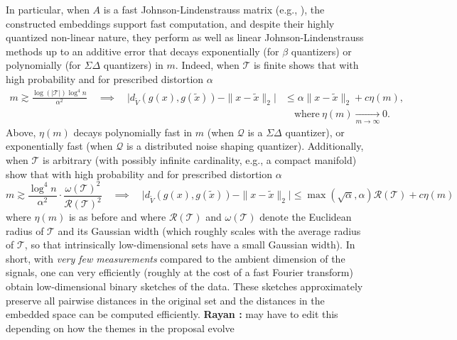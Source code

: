 \documentclass{article}
\newcommand{\comment}[3]{{\color{#1} {\bf #2 :} #3}}
\newcommand{\yoav}[1]{\comment{magenta}{Yoav}{#1}}
\newcommand{\rayan}[1]{\comment{red}{Rayan}{#1}}
\newcommand{\rad}{\mathcal{R}}
\begin{document}
In particular, when $A$ is a fast Johnson-Lindenstrauss matrix (e.g., \cite{}), the constructed embeddings support fast computation, and despite their highly quantized non-linear nature, they perform as well as linear Johnson-Lindenstrauss methods up to an additive error that decays exponentially (for $\beta$ quantizers) or polynomially (for $\Sigma\Delta$ quantizers)  in $m$. 
{Indeed, when $\mathcal{T}$ is finite} \cite{huynh2018fast} shows that with high probability %
and for prescribed distortion $\alpha$
\begin{align*} m \gtrsim \frac{\log{(|\mathcal{T}|)} \log^4 n}{\alpha^2} \quad \implies  \quad \big|d_{\widetilde{V}}(g(x), g(\tilde{x})) - \|x - \tilde{x}\|_2\big| & \leq {\alpha}\|x - \tilde{x}\|_2 + c\eta(m), \\ &\quad\text{where} \ \eta(m) \xrightarrow[m \rightarrow \infty]{} 0. \end{align*}
Above, $\eta(m)$ decays polynomially fast in $m$ (when $\mathcal{Q}$ is a $\Sigma\Delta$ quantizer), or exponentially fast (when $\mathcal{Q}$ is a distributed noise shaping quantizer). %
{Additionally, when $\mathcal{T}$ is arbitrary (with possibly infinite cardinality, e.g., a compact manifold)} \cite{huynh2018fast} show that with high probability  and for prescribed distortion $\alpha$
\[ m \gtrsim \frac{\log^4 n}{\alpha^2}\cdot\frac{\omega(\mathcal{T})^2}{\rad(\mathcal{T})^2} \quad \implies \quad \big|d_{\widetilde{V}}(g(x), g(\tilde{x})) - \|x - \tilde{x}\|_2\big| \leq \max(\sqrt{\alpha},\alpha) \rad(\mathcal{T}) + c\eta(m)\]
where $\eta(m)$ is as before and where $\rad(\mathcal{T})$ and $\omega(\mathcal{T})$ denote  the Euclidean radius of  $\mathcal{T}$ and its Gaussian width (which roughly scales with the average radius of $\mathcal{T}$, so that intrinsically low-dimensional sets have a small Gaussian width). %
 In short, with \emph{very few measurements} compared to the ambient dimension of the signals, one can very efficiently (roughly at the cost of a fast Fourier transform) obtain low-dimensional binary sketches of the data. These sketches approximately preserve all pairwise distances in the original set and the distances in the embedded space can be computed efficiently.  
\rayan{may have to edit this depending on how the themes in the proposal evolve}
\end{document}
